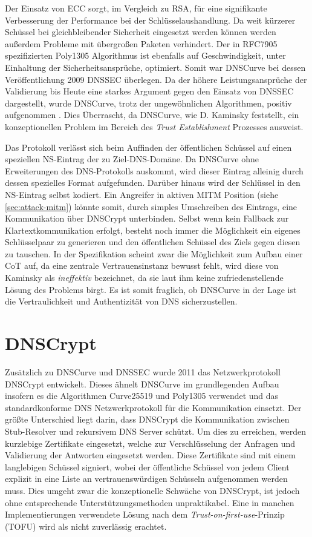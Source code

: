 Der Einsatz von ECC sorgt, im Vergleich zu RSA, für eine signifikante Verbesserung der Performance bei der Schlüsselaushandlung. Da weit kürzerer Schüssel bei gleichbleibender Sicherheit eingesetzt werden können werden außerdem Probleme mit übergroßen Paketen verhindert\cite{Gupta2002}. Der in RFC7905\cite{rfc7905} spezifizierten Poly1305 Algorithmus ist ebenfalls auf Geschwindigkeit, unter Einhaltung der Sicherheitsansprüche, optimiert\cite{Bernstein2005}. Somit war DNSCurve bei dessen Veröffentlichung 2009 DNSSEC überlegen. Da der höhere Leistungsansprüche der Validierung bis Heute eine starkes Argument gegen den Einsatz von DNSSEC dargestellt, wurde DNSCurve, trotz der ungewöhnlichen Algorithmen, positiv aufgenommen \cite{Henry2013}. Dies Überrascht, da DNSCurve, wie D. Kaminsky feststellt, ein konzeptionellen Problem im Bereich des \textit{Trust Establishment} Prozesses ausweist\cite{Kaminsky2011}. 

Das Protokoll verlässt sich beim Auffinden der öffentlichen Schüssel auf einen speziellen NS-Eintrag der zu Ziel-DNS-Domäne. Da DNSCurve ohne Erweiterungen des DNS-Protokolls auskommt, wird dieser Eintrag alleinig durch dessen spezielles Format aufgefunden. Darüber hinaus wird der Schlüssel in den NS-Eintrag selbst kodiert. Ein Angreifer in aktiven MITM Position (siehe \ref{sec:attack-mitm}) könnte somit, durch simples Umschreiben des Eintrags, eine Kommunikation über DNSCrypt unterbinden. Selbst wenn kein Fallback zur Klartextkommunikation erfolgt, besteht noch immer die Möglichkeit ein eigenes Schlüsselpaar zu generieren und den öffentlichen Schüssel des Ziels gegen diesen zu tauschen. In der Spezifikation scheint zwar die Möglichkeit zum Aufbau einer CoT auf, da eine zentrale Vertrauensinstanz bewusst fehlt, wird diese von Kaminsky als \textit{ineffektiv} bezeichnet, da sie laut ihm keine zufriedenstellende Lösung des Problems birgt. Es ist somit fraglich, ob DNSCurve in der Lage ist die Vertraulichkeit und Authentizität von DNS sicherzustellen.  

\section{DNSCrypt}
Zusätzlich zu DNSCurve und DNSSEC wurde 2011 das Netzwerkprotokoll DNSCrypt entwickelt. Dieses ähnelt DNSCurve im grundlegenden Aufbau insofern es die Algorithmen Curve25519 und Poly1305 verwendet und das standardkonforme DNS Netzwerkprotokoll für die Kommunikation einsetzt. Der größte Unterschied liegt darin, dass DNSCrypt die Kommunikation zwischen Stub-Resolver und rekursivem DNS Server schützt. Um dies zu erreichen, werden kurzlebige Zertifikate eingesetzt, welche zur Verschlüsselung der Anfragen und Validierung der Antworten eingesetzt werden. Diese Zertifikate sind mit einem langlebigen Schüssel signiert, wobei der öffentliche Schüssel von jedem Client explizit in eine Liste an vertrauenswürdigen Schüsseln aufgenommen werden muss\cite{Denis2016}. Dies umgeht zwar die konzeptionelle Schwäche von DNSCrypt, ist jedoch ohne entsprechende Unterstützungsmethoden unpraktikabel. Eine in manchen Implementierungen verwendete Lösung nach dem \textit{Trust-on-first-use}-Prinzip (TOFU) wird als nicht zuverlässig erachtet\cite{Wendlandt2008}. 


